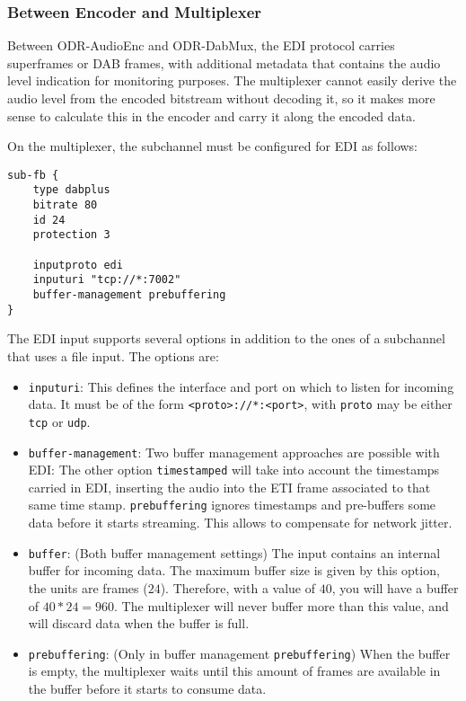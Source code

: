 \subsubsection{Between Encoder and Multiplexer}
\label{sec:between_encoder_and_multiplexer}

Between ODR-AudioEnc and ODR-DabMux, the EDI protocol carries \dabplus{}
superframes or DAB frames, with additional metadata that contains the audio
level indication for monitoring purposes.
The multiplexer cannot easily derive the audio level from the encoded bitstream
without decoding it, so it makes more sense to calculate this in the encoder and
carry it along the encoded data.

On the multiplexer, the subchannel must be configured for EDI as follows:
\begin{lstlisting}
sub-fb {
    type dabplus
    bitrate 80
    id 24
    protection 3

    inputproto edi
    inputuri "tcp://*:7002"
    buffer-management prebuffering
}
\end{lstlisting}

The EDI input supports several options in addition to the ones of a
subchannel that uses a file input. The options are:

\begin{itemize}
    \item \texttt{inputuri}: This defines the interface and port on which to
        listen for incoming data. It must be of the form
        \texttt{<proto>://*:<port>}, with \texttt{proto} may be either
        \texttt{tcp} or \texttt{udp}.

    \item \texttt{buffer-management}: Two buffer management approaches are
        possible with EDI:
        The other option \texttt{timestamped} will take
        into account the timestamps carried in EDI, inserting the audio into the
        ETI frame associated to that same time stamp.
        \texttt{prebuffering} ignores timestamps and
        pre-buffers some data before it starts streaming. This allows to
        compensate for network jitter.

    \item \texttt{buffer}: (Both buffer management settings)
        The input contains an internal buffer for
        incoming data. The maximum buffer size is given by this option, the
        units are frames ($24$\ms). Therefore, with a value of $40$, you
        will have a buffer of $40 * 24 = 960$\ms. The multiplexer will never
        buffer more than this value, and will discard data when the buffer is
        full.

    \item \texttt{prebuffering}: (Only in buffer management \texttt{prebuffering})
        When the buffer is empty, the multiplexer
        waits until this amount of frames are available in the buffer
        before it starts to consume data.
\end{itemize}

